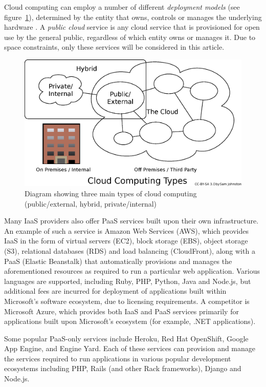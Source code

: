 \documentclass[a4paper]{proc}
\begin{document}
  Cloud computing can employ a number of different \emph{deployment models} (see figure~\ref{fig:cloud_computing_types}), determined by the entity that owns, controls or manages the underlying hardware \cite{Mell2011}. A \emph{public cloud} service is any cloud service that is provisioned for open use by the general public, regardless of which entity owns or manages it. Due to space constraints, only these services will be considered in this article.

  \begin{figure}
    \centering
    \includegraphics[width=\columnwidth]{figures/Cloud_computing_types.eps}
    \caption{Diagram showing three main types of cloud computing (public/external, hybrid, private/internal) \cite{Joton2009}}
    \label{fig:cloud_computing_types}
  \end{figure}

  Many IaaS providers also offer PaaS services built upon their own infrastructure. An example of such a service is Amazon Web Services (AWS), which provides IaaS in the form of virtual servers (EC2), block storage (EBS), object storage (S3), relational databases (RDS) and load balancing (CloudFront), along with a PaaS (Elastic Beanstalk) that automatically provisions and manages the aforementioned resources as required to run a particular web application. Various languages are supported, including Ruby, PHP, Python, Java and Node.js, but additional fees are incurred for deployment of applications built within Microsoft's software ecosystem, due to licensing requirements. A competitor is Microsoft Azure, which provides both IaaS and PaaS services primarily for applications built upon Microsoft's ecosystem (for example, .NET applications).

  Some popular PaaS-only services include Heroku, Red Hat OpenShift, Google App Engine, and Engine Yard. Each of these services can provision and manage the services required to run applications in various popular development ecosystems including PHP, Rails (and other Rack frameworks), Django and Node.js.
\end{document}
